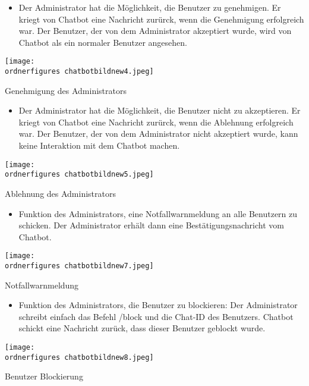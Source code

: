 \begin{itemize}
	\item Der Administrator hat die M\"oglichkeit, die Benutzer zu genehmigen. Er kriegt von Chatbot eine Nachricht zur\"urck, wenn die Genehmigung erfolgreich war. Der Benutzer, der von dem Administrator akzeptiert wurde, wird von Chatbot als ein normaler Benutzer angesehen.
\end{itemize}
\begin{center}
	\captionsetup{type=figure}
	\texttt{[image: \\ordnerfigures chatbotbildnew4.jpeg]}
	\caption{Genehmigung des Administrators}
	\label{chatbotbenjdf}
\end{center}
\begin{itemize}
	\item Der Administrator hat die M\"oglichkeit, die Benutzer nicht zu akzeptieren. Er kriegt von Chatbot eine Nachricht zur\"urck, wenn die Ablehnung erfolgreich war. Der Benutzer, der von dem Administrator nicht akzeptiert wurde, kann keine Interaktion mit dem Chatbot machen.
\end{itemize}
\begin{center}
	\captionsetup{type=figure}
	\texttt{[image: \\ordnerfigures chatbotbildnew5.jpeg]}
	\caption{Ablehnung des Administrators}
	\label{chatbotbenjjdf}
\end{center}
\begin{itemize}
	\item Funktion des Administrators, eine Notfallwarnmeldung an alle Benutzern zu schicken. Der Administrator erhält dann eine Bestätigungsnachricht vom Chatbot.
\end{itemize}
\begin{center}
	\captionsetup{type=figure}
	\texttt{[image: \\ordnerfigures chatbotbildnew7.jpeg]}
	\caption{Notfallwarnmeldung}
	\label{chatbfotbenjjdf}
\end{center}
\begin{itemize}
	\item Funktion des Administrators, die Benutzer zu blockieren: Der Administrator schreibt einfach das Befehl /block und die Chat-ID des Benutzers. Chatbot schickt eine Nachricht zurück, dass dieser Benutzer geblockt wurde.
\end{itemize}
\begin{center}
	\captionsetup{type=figure}
	\texttt{[image: \\ordnerfigures chatbotbildnew8.jpeg]}
	\caption{Benutzer Blockierung}
	\label{fig:chatbotblock} 
	\captionsetup{type=figure} 
\end{center}
